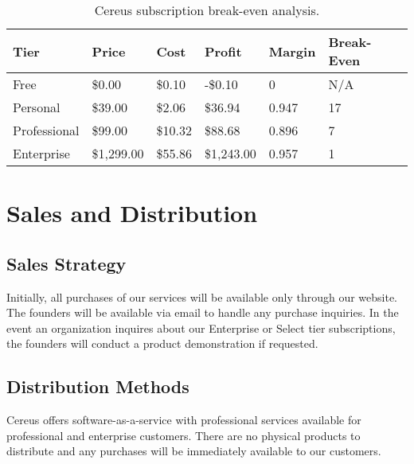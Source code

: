 \begin{table}[H]
  \centering
  \begin{tabularx}{\textwidth}{|X|X|X|X|X|X|}
    Tier & Price & Cost & Profit & Margin & Break-Even \\
  
    \hline
  
    Free & \$0.00 & \$0.10 & -\$0.10 & 0 & N/A \\

    \hline
  
    Personal & \$39.00 & \$2.06 & \$36.94 & 0.947 & 17 \\ 

    \hline
  
    Professional & \$99.00 & \$10.32 & \$88.68 & 0.896 & 7 \\ 

    \hline

    Enterprise & \$1,299.00 & \$55.86 & \$1,243.00 & 0.957 & 1 \\ 

  \end{tabularx}
  \caption{Cereus subscription break-even analysis.}
  \label{table.cereus.breakeven}
\end{table}


\section{Sales and Distribution}

\subsection{Sales Strategy}

Initially, all purchases of our services will be available only through our website. The founders will be available via email to handle any purchase inquiries. In the event an organization inquires about our Enterprise or Select tier subscriptions, the founders will conduct a product demonstration if requested.

\subsection{Distribution Methods}

Cereus offers software-as-a-service with professional services available for professional and enterprise customers. There are no physical products to distribute and any purchases will be immediately available to our customers.

